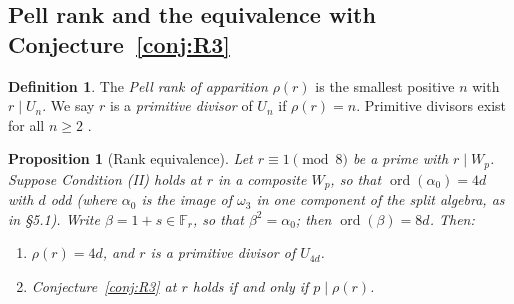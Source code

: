 \documentclass[12pt]{article}
\theoremstyle{plain}
\newtheorem{proposition}[theorem]{Proposition}
\theoremstyle{definition}
\newtheorem{definition}[theorem]{Definition}
\theoremstyle{remark}
\begin{document}
\subsection{Pell rank and the equivalence with Conjecture~\ref{conj:R3}}


\begin{definition}
The \emph{Pell rank of apparition} \(\rho(r)\) is the
smallest positive \(n\) with \(r \mid U_n\). We say \(r\) is a
\emph{primitive divisor} of \(U_n\) if \(\rho(r) = n\). Primitive divisors
exist for all \(n \geq 2\) \cite{ref2}.
\end{definition}


\begin{proposition}[Rank equivalence]\label{prop:rank-equivalence}
Let \(r \equiv 1 \pmod{8}\)
be a prime with \(r \mid W_p\). Suppose Condition (II) holds at \(r\)
in a composite \(W_p\), so that \(\operatorname{ord}(\alpha_0) = 4d\)
with \(d\) odd (where \(\alpha_0\) is the image of \(\omega_3\) in
one component of the split algebra, as in \S5.1). Write
\(\beta = 1+s \in \mathbb F_r\), so that \(\beta^2 = \alpha_0\); then
\(\operatorname{ord}(\beta) = 8d\). Then:
\begin{enumerate}
\item[\textup{(a)}] \(\rho(r) = 4d\), and \(r\) is a primitive divisor of \(U_{4d}\).
\item[\textup{(b)}] Conjecture~\ref{conj:R3} at \(r\) holds if and only if \(p \mid \rho(r)\).
\end{enumerate}
\end{proposition}
\end{document}

